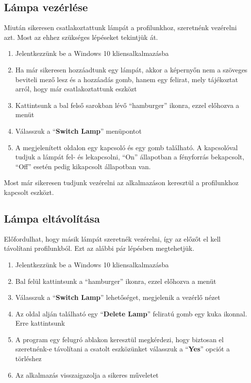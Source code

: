 \documentclass[a4paper,12pt]{report}
\begin{document}
    \subsection{Lámpa vezérlése}
    Miután sikeresen csatlakoztattunk lámpát a profilunkhoz, szeretnénk vezérelni azt. Most az ehhez szükséges lépéseket tekintjük át.

    \begin{enumerate}
        \item Jelentkezzünk be a Windows 10 kliensalkalmazásba
        \item Ha már sikeresen hozzáadtunk egy lámpát, akkor a képernyőn nem a szöveges beviteli mező lesz és a hozzáadás gomb, hanem
        egy felirat, mely tájékoztat arról, hogy már csatlakoztattunk eszközt
        \item Kattintsunk a bal felső sarokban lévő ``hamburger'' ikonra, ezzel előhozva a menüt
        \item Válasszuk a ``\textbf{Switch Lamp}'' menüpontot
        \item A megjelenített oldalon egy kapcsoló és egy gomb található. A kapcsolóval tudjuk a lámpát fel- és lekapcsolni, ``On''
        állapotban a fényforrás bekapcsolt, ``Off'' esetén pedig kikapcsolt állapotban van.
    \end{enumerate}

    Most már sikeresen tudjunk vezérelni az alkalmazáson keresztül a profilunkhoz kapcsolt eszközt.

    \subsection{Lámpa eltávolítása}
    Előfordulhat, hogy másik lámpát szeretnék vezérelni, így az előzőt el kell távolítani profilunkból. Ezt az alábbi pár lépésben
    megtehetjük.

    \begin{enumerate}
        \item Jelentkezzünk be a Windows 10 kliensalkalmazásba
        \item Bal felül kattintsunk a ``hamburger'' ikonra, ezzel előhozva a menüt
        \item Válasszuk a ``\textbf{Switch Lamp}'' lehetőséget, megjelenik a vezérlő nézet
        \item Az oldal alján található egy ``\textbf{Delete Lamp}'' feliratú gomb egy kuka ikonnal. Erre kattintsunk
        \item A program egy felugró ablakon keresztül megkérdezi, hogy biztosan el szeretnénk-e távolítani a csatolt eszközünket
        válasszuk a ``\textbf{Yes}'' opciót a törléshez
        \item Az alkalmazás visszaigazolja a sikeres műveletet
    \end{enumerate}
\end{document}
